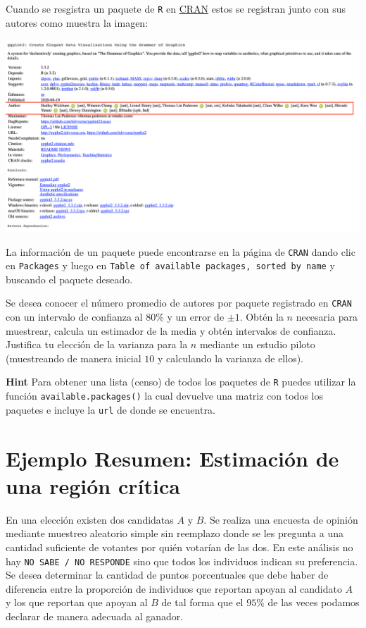 \documentclass[
]{book}
\begin{document}
Cuando se resgistra un paquete de \texttt{R} en \href{https://cran.r-project.org}{CRAN} estos se registran junto con sus autores como muestra la imagen:

\includegraphics[width=0.75\linewidth]{images/CRAN}

La información de un paquete puede encontrarse en la página de \texttt{CRAN} dando clic en \texttt{Packages} y luego en \texttt{Table\ of\ available\ packages,\ sorted\ by\ name} y buscando el paquete deseado.

Se desea conocer el número promedio de autores por paquete registrado en \texttt{CRAN} con un intervalo de confianza al 80\% y un error de \(\pm 1\). Obtén la \(n\) necesaria para muestrear, calcula un estimador de la media y obtén intervalos de confianza. Justifica tu elección de la varianza para la \(n\) mediante un estudio piloto (muestreando de manera inicial \(10\) y calculando la varianza de ellos).

\textbf{Hint} Para obtener una lista (censo) de todos los paquetes de \texttt{R} puedes utilizar la función \texttt{available.packages()} la cual devuelve una matriz con todos los paquetes e incluye la \texttt{url} de donde se encuentra.

\hypertarget{ejemplo-resumen-estimaciuxf3n-de-una-regiuxf3n-cruxedtica}{%
\section{Ejemplo Resumen: Estimación de una región crítica}\label{ejemplo-resumen-estimaciuxf3n-de-una-regiuxf3n-cruxedtica}}

En una elección existen dos candidatas \(A\) y \(B\). Se realiza una encuesta de opinión mediante muestreo aleatorio simple sin reemplazo donde se les pregunta a una cantidad suficiente de votantes por quién votarían de las dos. En este análisis no hay \texttt{NO\ SABE\ /\ NO\ RESPONDE} sino que todos los individuos indican su preferencia. Se desea determinar la cantidad de puntos porcentuales que debe haber de diferencia entre la proporción de individuos que reportan apoyan al candidato \(A\) y los que reportan que apoyan al \(B\) de tal forma que el \(95\%\) de las veces podamos declarar de manera adecuada al ganador.
\end{document}
